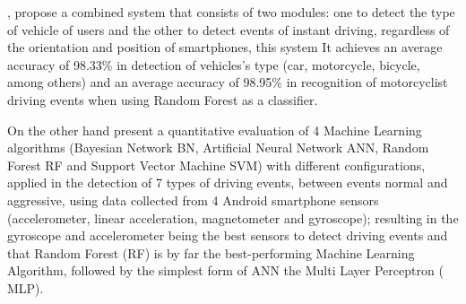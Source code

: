 \vspace{5mm} %

, propose a combined system that consists of two modules: one to detect the type of vehicle of users and the other to detect events of instant driving, regardless of the orientation and position of smartphones, this system It achieves an average accuracy of 98.33\% in detection of vehicles's type (car, motorcycle, bicycle, among others) and an average accuracy of 98.95\% in recognition of motorcyclist driving events when using Random Forest as a classifier.

\vspace{5mm} %

On the other hand  present a quantitative evaluation of 4 Machine Learning algorithms (Bayesian Network BN, Artificial Neural Network ANN, Random Forest RF and Support Vector Machine SVM) with different configurations, applied in the detection of 7 types of driving events, between events normal and aggressive, using data collected from 4 Android smartphone sensors (accelerometer, linear acceleration, magnetometer and gyroscope); resulting in the gyroscope and accelerometer being the best sensors to detect driving events and that Random Forest (RF) is by far the best-performing Machine Learning Algorithm, followed by the simplest form of ANN the Multi Layer Perceptron ( MLP).

